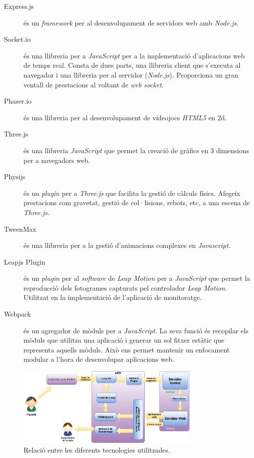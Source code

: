\documentclass[12pt,a4paper,catalan]{article}
\begin{document}
	\begin{description}
		\item[Express.js] és un \textit{framework} per al desenvolupament de servidors web amb \textit{Node.js}.
		\item[Socket.io] és una llibreria per a \textit{JavaScript} per a la implementació d'aplicacions web de temps real. Consta de dues parts, una llibreria client que s'executa al navegador i una llibreria per al servidor (\textit{Node.js}). Proporciona un gran ventall de prestacions al voltant de \textit{web socket}.
		\item[Phaser.io] és una llibreria per al desenvolupament de videojocs \textit{HTML5} en 2d.
		\item[Three.js] és una llibreria \textit{JavaScript} que permet la creació de gràfics en 3 dimensions per a navegadors web.
		\item[Physijs] és un \textit{plugin} per a \textit{Three.js} que facilita la gestió de càlculs físics. Afegeix prestacions com gravetat, gestió de col·lisions, rebots, etc, a una escena de \textit{Three.js}.
		\item[TweenMax] és una llibreria per a la gestió d'animacions complexes en \textit{Javascript}.
		\item[Leapjs Plugin] és un \textit{plugin} per al \textit{software} de \textit{Leap Motion} per a \textit{JavaScript} que permet la reproducció dels fotogrames capturats pel controlador \textit{Leap Motion}. Utilitzat en la implementació de l'aplicació de monitoratge.
		\item[Webpack] és un agregador de mòduls per a \textit{JavaScript}. La seva funció és recopilar els mòduls que utilitza una aplicació i generar un sol fitxer estàtic que representa aquells mòduls. Això ens permet mantenir un enfocament modular a l'hora de desenvolupar aplicacions web.
	\end{description}
	\begin{figure}[H]
		\includegraphics[width=0.8\textwidth,keepaspectratio]{technologies.png}
		\centering
		\caption{Relació entre les diferents tecnologies utilitzades.}
		\label{fig:technolgies}
	\end{figure}
\end{document}
